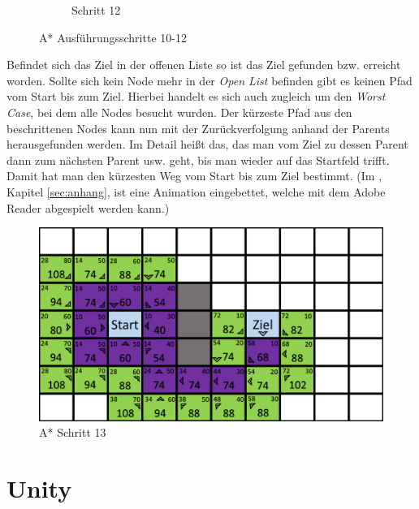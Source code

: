 \begin{figure}[H]
\begin{subfigure}[b]{0.3\textwidth}
        \caption{Schritt 12}
        \label{fig:aStartStep12}
    \end{subfigure}
    \caption{A* Ausführungsschritte 10-12}\label{fig:aStarStep10_12}
\end{figure}

Befindet sich das Ziel in der offenen Liste so ist das Ziel gefunden bzw. erreicht worden. Sollte sich kein Node mehr in der \textit{Open List} befinden gibt es keinen Pfad vom Start bis zum Ziel. Hierbei handelt es sich auch zugleich um den \textit{Worst Case}, bei dem alle Nodes besucht wurden.
Der kürzeste Pfad aus den beschrittenen Nodes kann nun mit der Zurückverfolgung anhand der Parents herausgefunden werden. Im Detail hei\ss t das, das man vom Ziel zu dessen Parent dann zum nächsten Parent usw. geht, bis man wieder auf das Startfeld trifft. Damit hat man den kürzesten Weg vom Start bis zum Ziel bestimmt. (Im , Kapitel \ref{sec:anhang}, ist eine Animation eingebettet, welche mit dem Adobe Reader abgespielt werden kann.)  
\begin{figure}[H]
    \centering
    \includegraphics[width=\textwidth]{assets/aStarStep13.png}
    \caption{A* Schritt 13}\label{fig:aStarStep13}
\end{figure}
\section{Unity}

